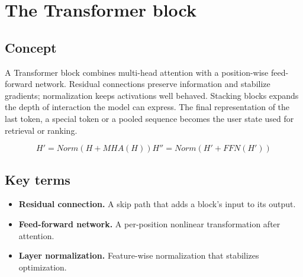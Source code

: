 \section{The Transformer block}

\begin{abstract}
Attention mixes positions; the feed-forward network transforms each position.
\end{abstract}

\subsection{Concept}
A Transformer block combines multi-head attention with a position-wise feed-forward network. Residual connections preserve information and stabilize gradients; normalization keeps activations well behaved. Stacking blocks expands the depth of interaction the model can express. The final representation of the last token, a special token or a pooled sequence becomes the user state used for retrieval or ranking.

\begin{equation*}
H′ = Norm(H + MHA(H))      H″ = Norm(H′ + FFN(H′))
\end{equation*}

\subsection{Key terms}
\begin{itemize}
\item \textbf{Residual connection.} A skip path that adds a block’s input to its output.
\item \textbf{Feed-forward network.} A per-position nonlinear transformation after attention.
\item \textbf{Layer normalization.} Feature-wise normalization that stabilizes optimization.
\end{itemize}
